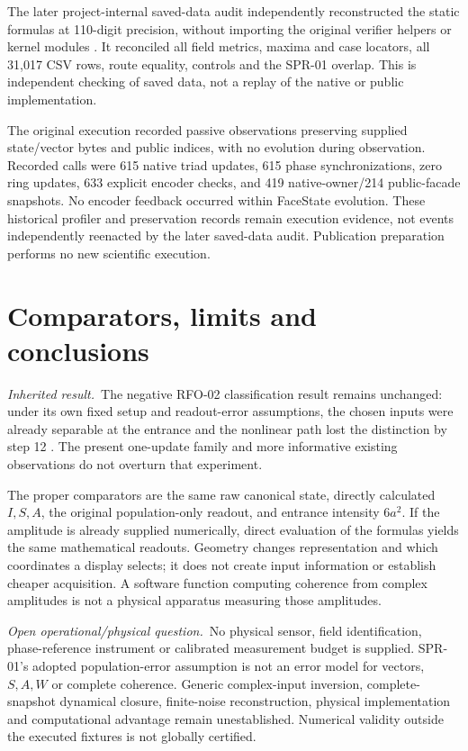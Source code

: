 \documentclass[11pt,a4paper]{article}
\newcommand{\inherited}{\textit{Inherited result.}}
\newcommand{\openquestion}{\textit{Open operational/physical question.}}
\begin{document}
The later project-internal saved-data audit independently reconstructed the static formulas at 110-digit precision, without importing the original verifier helpers or kernel modules \cite{review}. It reconciled all field metrics, maxima and case locators, all 31,017 CSV rows, route equality, controls and the SPR-01 overlap. This is independent checking of saved data, not a replay of the native or public implementation.

The original execution recorded passive observations preserving supplied state/vector bytes and public indices, with no evolution during observation. Recorded calls were 615 native triad updates, 615 phase synchronizations, zero ring updates, 633 explicit encoder checks, and 419 native-owner/214 public-facade snapshots. No encoder feedback occurred within FaceState evolution. These historical profiler and preservation records remain execution evidence, not events independently reenacted by the later saved-data audit. Publication preparation performs no new scientific execution.

\clearpage
\section{Comparators, limits and conclusions}\label{sec:limits}
\inherited\ The negative RFO-02 classification result remains unchanged: under its own fixed setup and readout-error assumptions, the chosen inputs were already separable at the entrance and the nonlinear path lost the distinction by step 12 \cite[Section 9]{spr01}. The present one-update family and more informative existing observations do not overturn that experiment.

The proper comparators are the same raw canonical state, directly calculated $I,S,A$, the original population-only readout, and entrance intensity $6a^2$. If the amplitude is already supplied numerically, direct evaluation of the formulas yields the same mathematical readouts. Geometry changes representation and which coordinates a display selects; it does not create input information or establish cheaper acquisition. A software function computing coherence from complex amplitudes is not a physical apparatus measuring those amplitudes.

\openquestion\ No physical sensor, field identification, phase-reference instrument or calibrated measurement budget is supplied. SPR-01's adopted population-error assumption is not an error model for vectors, $S,A,W$ or complete coherence. Generic complex-input inversion, complete-snapshot dynamical closure, finite-noise reconstruction, physical implementation and computational advantage remain unestablished. Numerical validity outside the executed fixtures is not globally certified.
\end{document}
